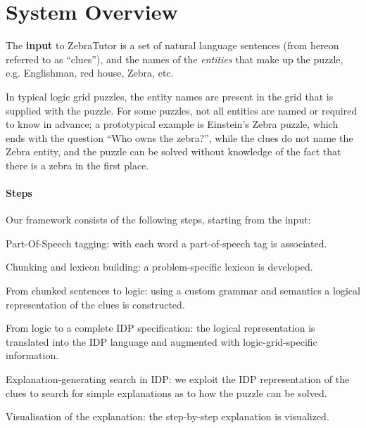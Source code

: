 \documentclass[runningheads]{llncs}
\newcommand{\zebratutor}{ZebraTutor\xspace}
\newcommand{\ourtool}{\zebratutor}
\newcommand{\idp}{IDP\xspace}
\begin{document}
\section{System Overview}

The \textbf{input} to \ourtool is a set of natural language sentences (from hereon referred to as ``clues''), and the names of the \textit{entities} that make up the puzzle, e.g. Englishman, red house, Zebra, etc. %

In typical logic grid puzzles, the entity names are present in the grid that is supplied with the puzzle. For some puzzles, not all entities are named or required to know in advance; a prototypical example is Einstein's Zebra puzzle, which ends with the question ``Who owns the zebra?'', while the clues do not name the Zebra entity, and the puzzle can be solved without knowledge of the fact that there is a zebra in the first place. 

%



\paragraph{Steps}
Our framework consists of the following steps, starting from the input:
\begin{compactenum}
\item Part-Of-Speech tagging: with each word a part-of-speech tag is associated.
\item Chunking and lexicon building: a problem-specific lexicon is developed.
\item From chunked sentences to logic: using a custom grammar and semantics a logical representation of the clues is constructed.
 \item From logic to a complete IDP specification: the logical representation is translated into the \idp language and augmented with logic-grid-specific information. \label{step:toidp}
\item Explanation-generating search in IDP: we exploit the \idp representation of the clues to search for simple explanations as to how the puzzle can be solved.
\item Visualisation of the explanation: the step-by-step explanation is visualized.
\end{compactenum}
% 
% 
\end{document}
